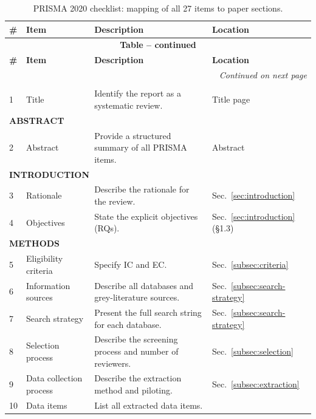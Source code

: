 \begin{longtable}{p{0.4cm}p{3.5cm}p{5.5cm}p{2.5cm}}
\caption{PRISMA 2020 checklist: mapping of all 27 items to paper sections.}
\label{tab:prisma-checklist}\\
\toprule
\textbf{\#} & \textbf{Item} & \textbf{Description} & \textbf{Location} \\
\midrule
\endfirsthead
\multicolumn{4}{c}{{\bfseries Table \thetable{} -- continued}}\\
\toprule
\textbf{\#} & \textbf{Item} & \textbf{Description} & \textbf{Location} \\
\midrule
\endhead
\midrule
\multicolumn{4}{r}{\textit{Continued on next page}}\\
\endfoot
\bottomrule
\endlastfoot
%
\multicolumn{4}{l}{\textbf{TITLE}}\\
1  & Title           & Identify the report as a systematic review.
                     & Title page \\[3pt]
\multicolumn{4}{l}{\textbf{ABSTRACT}}\\
2  & Abstract        & Provide a structured summary of all PRISMA items.
                     & Abstract \\[3pt]
\multicolumn{4}{l}{\textbf{INTRODUCTION}}\\
3  & Rationale       & Describe the rationale for the review.
                     & Sec.~\ref{sec:introduction} \\
4  & Objectives      & State the explicit objectives (RQs).
                     & Sec.~\ref{sec:introduction} (\S1.3) \\[3pt]
\multicolumn{4}{l}{\textbf{METHODS}}\\
5  & Eligibility criteria    & Specify IC and EC.
                     & Sec.~\ref{subsec:criteria} \\
6  & Information sources     & Describe all databases and grey-literature sources.
                     & Sec.~\ref{subsec:search-strategy} \\
7  & Search strategy         & Present the full search string for each database.
                     & Sec.~\ref{subsec:search-strategy} \\
8  & Selection process       & Describe the screening process and number of reviewers.
                     & Sec.~\ref{subsec:selection} \\
9  & Data collection process & Describe the extraction method and piloting.
                     & Sec.~\ref{subsec:extraction} \\
10 & Data items              & List all extracted data items.

\end{longtable}
